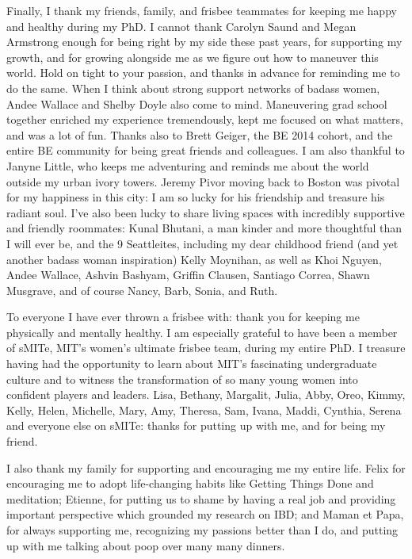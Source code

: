 \begin{singlespace}
Finally, I thank my friends, family, and frisbee teammates for keeping me happy and healthy during my PhD.
I cannot thank Carolyn Saund and Megan Armstrong enough for being right by my side these past years, for supporting my growth, and for growing alongside me as we figure out how to maneuver this world.
Hold on tight to your passion, and thanks in advance for reminding me to do the same.
When I think about strong support networks of badass women, Andee Wallace and Shelby Doyle also come to mind.
Maneuvering grad school together enriched my experience tremendously, kept me focused on what matters, and was a lot of fun.
Thanks also to Brett Geiger, the BE 2014 cohort, and the entire BE community for being great friends and colleagues.
I am also thankful to Janyne Little, who keeps me adventuring and reminds me about the world outside my urban ivory towers.
Jeremy Pivor moving back to Boston was pivotal for my happiness in this city: I am so lucky for his friendship and treasure his radiant soul.
I've also been lucky to share living spaces with incredibly supportive and friendly roommates: Kunal Bhutani, a man kinder and more thoughtful than I will ever be, and the 9 Seattleites, including my dear childhood friend (and yet another badass woman inspiration) Kelly Moynihan, as well as Khoi Nguyen, Andee Wallace, Ashvin Bashyam, Griffin Clausen, Santiago Correa, Shawn Musgrave, and of course Nancy, Barb, Sonia, and Ruth.

To everyone I have ever thrown a frisbee with: thank you for keeping me physically and mentally healthy. I am especially grateful to have been a member of sMITe, MIT's women's ultimate frisbee team, during my entire PhD. I treasure having had the opportunity to learn about MIT's fascinating undergraduate culture and to witness the transformation of so many young women into confident players and leaders. Lisa, Bethany, Margalit, Julia, Abby, Oreo, Kimmy, Kelly, Helen, Michelle, Mary, Amy, Theresa, Sam, Ivana, Maddi, Cynthia, Serena and everyone else on sMITe: thanks for putting up with me, and for being my friend.

I also thank my family for supporting and encouraging me my entire life. Felix for encouraging me to adopt life-changing habits like Getting Things Done and meditation; Etienne, for putting us to shame by having a real job and providing important perspective which grounded my research on IBD; and Maman et Papa, for always supporting me, recognizing my passions better than I do, and putting up with me talking about poop over many many dinners.

\end{singlespace}

